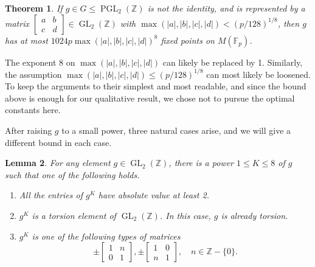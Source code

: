 \documentclass[10pt]{amsart}
\newtheorem{theo}{Theorem}[section]
\newtheorem{lemm}[theo]{Lemma}\newtheorem{prop}[theo]{Proposition}\newtheorem{coro}[theo]{Corollary}\newtheorem{conj}[theo]{Conjecture}
\theoremstyle{definition}\newtheorem{defi}[theo]{Definition}\newtheorem{rema}[theo]{Remark}\newtheorem{exam}[theo]{Example}\newtheorem{exem}[theo]{Example}\newtheorem{nota}[theo]{Notation}
\newcommand{\Z}{\mathbb{Z}}
\newcommand{\F}{\mathbb{F}}
\DeclareMathOperator{\GL}{GL}
\DeclareMathOperator{\PGL}{PGL}
\begin{document}
\begin{theo}\label{thm:fixed-points}
If $g\in G\leq\PGL_{2}(\Z)$ is not the identity, and is represented by a matrix $\left[
\begin{smallmatrix}a & b\\
c & d
\end{smallmatrix}\right]\in\GL_{2}(\Z)$ with $\max(|a|,|b|,|c|,|d|) < (p/128)^{1/8}$, then $g$ has at most $1024p\max(|a|,|b|,|c|,|d|)^{8}$ fixed points on $M(\F_{p})$.
\end{theo}

The exponent 8 on $\max(|a|,|b|,|c|,|d|)$ can likely be replaced by 1. Similarly, the assumption $\max(|a|,|b|,|c|,|d|)\leq(p/128)^{1/8}$ can most likely be loosened. To keep the arguments to their simplest and most readable, and since the bound above is enough for our qualitative result, we chose not to pursue the optimal constants here.

After raising $g$ to a small power, three natural cases arise, and we will give a different bound in each case.


\begin{lemm}\label{lem:power}
For any element $g\in\GL_{2}(\Z)$, there is a power $1\leq K\leq8$ of $g$ such that one of the following holds.
\begin{enumerate}
\item All the entries of $g^{K}$ have absolute value at least 2.
\item $g^{K}$ is a torsion element of $\GL_{2}(\Z)$. In this case, $g$ is already torsion.
\item $g^{K}$ is one of the following types of matrices
\begin{equation}\label{eq:parabolic}
\pm
\begin{bmatrix}1 & n\\
0 & 1
\end{bmatrix},
\pm
\begin{bmatrix}1 & 0\\
n & 1
\end{bmatrix},\quad n\in\Z-\{0\}.
\end{equation}
\end{enumerate}
\end{lemm}
\end{document}
